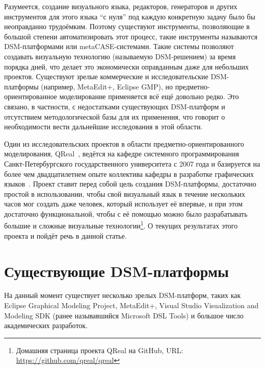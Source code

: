 \documentclass[a4]{article}
\begin{document}
Разумеется, создание визуального языка, редакторов, генераторов и других инструментов для этого языка “с нуля” под каждую конкретную задачу было бы неоправданно трудоёмким. Поэтому существуют инструменты, позволяющие в большой степени автоматизировать этот процесс, такие инструменты называются DSM-платформами или metaCASE-системами. Такие системы позволяют создавать визуальную технологию (называемую DSM-решением) за время порядка дней, что делает это экономически оправданным даже для небольших проектов. Существуют зрелые коммерческие и исследовательские DSM-платформы (например, MetaEdit+, Eclipse GMP), но предметно-ориентированное моделирование применяется всё ещё довольно редко. Это связано, в частности, с недостатками существующих DSM-платформ и отсутствием методологической базы для их применения, что говорит о необходимости вести дальнейшие исследования в этой области.

Один из исследовательских проектов в области предметно-ориентированного моделирования, QReal~\cite{qreal2, qreal1}, ведётся на кафедре системного программирования Санкт-Петербургского государственного университета с 2007 года и базируется на более чем двадцатилетнем опыте коллектива кафедры в разработке графических языков~\cite{rtst1, rtst2, rtst4, rtst3, asu, rtst5}. Проект ставит перед собой цель создания DSM-платформы, достаточно простой в использовании, чтобы свой визуальный язык в течение нескольких часов мог создать даже человек, который использует её впервые, и при этом достаточно функциональной, чтобы с её помощью можно было разрабатывать большие и сложные визуальные технологии\footnote{Домашняя страница проекта QReal на GitHub, URL: \url{https://github.com/qreal/qreal}}. О текущих результатах этого проекта и пойдёт речь в данной статье.

\section{Существующие DSM-платформы}

На данный момент существует несколько зрелых DSM-платформ, таких как Eclipse Graphical Modeling Project, MetaEdit+, Visual Studio Visualization and Modeling SDK (ранее называвшийся Microsoft DSL Tools) и большое число академических разработок. 
\end{document}
